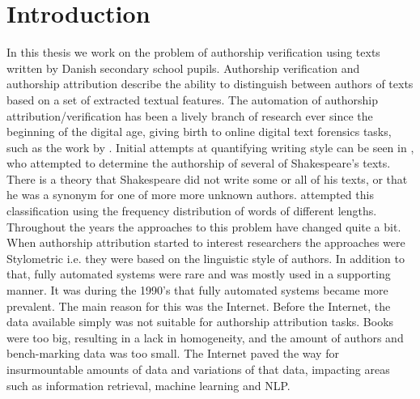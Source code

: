 %

\section{Introduction} \label{sec:introduction}


In this thesis we work on the problem of authorship verification using texts
written by Danish secondary school pupils. Authorship verification and
authorship attribution describe the ability to distinguish between authors of
texts based on a set of extracted textual features. The automation of authorship
attribution/verification has been a lively branch of research ever since the
beginning of the digital age, giving birth to online digital text forensics
tasks, such as the work by \citet{pan:2015}. Initial attempts at quantifying
writing style can be seen in \citet{Mendenhall237}, who attempted to determine
the authorship of several of Shakespeare's texts. There is a theory that
Shakespeare did not write some or all of his texts, or that he was a synonym
for one of more more unknown authors. \citet{Mendenhall237} attempted this
classification using the frequency distribution of words of different lengths.
Throughout the years the approaches to this problem have changed quite a bit.
When authorship attribution started to interest researchers the approaches were
Stylometric i.e. they were based on the linguistic style of authors. In addition
to that, fully automated systems were rare and was mostly used in a supporting
manner. It was during the 1990's that fully automated systems became more
prevalent. The main reason for this was the Internet. Before the Internet, the
data available simply was not suitable for authorship attribution tasks. Books
were too big, resulting in a lack in homogeneity, and the amount of authors and
bench-marking data was too small. The Internet paved the way for insurmountable
amounts of data and variations of that data, impacting areas such as information
retrieval, machine learning and \gls{NLP}.

